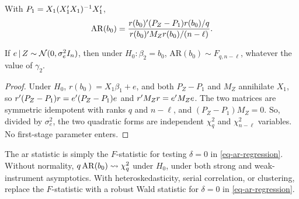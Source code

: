 \documentclass[a4paper,12pt]{article}
\begin{document}
\begin{definition}
	With $P_1=X_1(X_1^{\prime} X_1)^{-1} X_1^{\prime}$,
	\begin{align}
		\mathrm{AR}(b_0)=\frac{r(b_0)^{\prime}(P_Z-P_1)r(b_0)/q}{r(b_0)^{\prime} M_Zr(b_0)/(n-\ell)}.
	\end{align}
\end{definition}

\begin{theorem}\label{thm-ar-exact}
	If $e\mathpunct{}|\mathpunct{} Z\sim\operatorname{\mathcal{N}}(0,\sigma_e^2I_n)$, then under $H_0:\beta_2=b_0$,
	$\mathrm{AR}(b_0)\sim F_{q,n-\ell}$, whatever the value of $\gamma_2$.
\end{theorem}
\begin{proof}
	Under $H_0$, $r(b_0)=X_1\beta_1+e$, and both $P_Z-P_1$ and $M_Z$ annihilate $X_1$, so
	$r^{\prime}(P_Z-P_1)r=e^{\prime}(P_Z-P_1)e$ and $r^{\prime} M_Zr=e^{\prime} M_Ze$.
	The two matrices are symmetric idempotent with ranks $q$ and $n-\ell$, and $(P_Z-P_1)M_Z=0$.
	So, divided by $\sigma_e^2$, the two quadratic forms are independent $\chi^2_q$ and $\chi^2_{n-\ell}$ variables.
	No first-stage parameter enters.
\end{proof}

\begin{remark}
	The \gls{ar} statistic is simply the $F$-statistic for testing $\delta=0$ in \eqref{eq-ar-regression}.
	Without normality, $q\,\mathrm{AR}(b_0)\overset{}{\leadsto}\chi^2_q$ under $H_0$, under both strong and weak-instrument asymptotics.
	With heteroskedasticity, serial correlation, or clustering, replace the $F$-statistic with a robust Wald statistic for $\delta=0$ in \eqref{eq-ar-regression}.
\end{remark}
\end{document}
